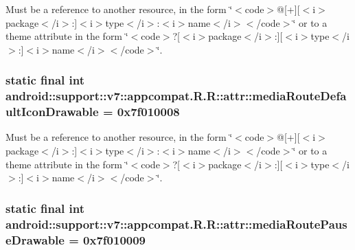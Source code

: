 Must be a reference to another resource, in the form \char`\"{}$<$code$>$@\mbox{[}+\mbox{]}\mbox{[}$<$i$>$package$<$/i$>$:\mbox{]}$<$i$>$type$<$/i$>$:$<$i$>$name$<$/i$>$$<$/code$>$\char`\"{} or to a theme attribute in the form \char`\"{}$<$code$>$?\mbox{[}$<$i$>$package$<$/i$>$:\mbox{]}\mbox{[}$<$i$>$type$<$/i$>$:\mbox{]}$<$i$>$name$<$/i$>$$<$/code$>$\char`\"{}. \hypertarget{classandroid_1_1support_1_1v7_1_1appcompat_1_1_r_1_1attr_a2b018175d87f4caa50b92655a0d5202}{
\subsubsection[{mediaRouteDefaultIconDrawable}]{\setlength{\rightskip}{0pt plus 5cm}static final int android::support::v7::appcompat.R.R::attr::mediaRouteDefaultIconDrawable = 0x7f010008}}
\label{classandroid_1_1support_1_1v7_1_1appcompat_1_1_r_1_1attr_a2b018175d87f4caa50b92655a0d5202}


Must be a reference to another resource, in the form \char`\"{}$<$code$>$@\mbox{[}+\mbox{]}\mbox{[}$<$i$>$package$<$/i$>$:\mbox{]}$<$i$>$type$<$/i$>$:$<$i$>$name$<$/i$>$$<$/code$>$\char`\"{} or to a theme attribute in the form \char`\"{}$<$code$>$?\mbox{[}$<$i$>$package$<$/i$>$:\mbox{]}\mbox{[}$<$i$>$type$<$/i$>$:\mbox{]}$<$i$>$name$<$/i$>$$<$/code$>$\char`\"{}. \hypertarget{classandroid_1_1support_1_1v7_1_1appcompat_1_1_r_1_1attr_590a7a8fdf38d9c1391d0c5e686c24ac}{
\subsubsection[{mediaRoutePauseDrawable}]{\setlength{\rightskip}{0pt plus 5cm}static final int android::support::v7::appcompat.R.R::attr::mediaRoutePauseDrawable = 0x7f010009}}
\label{classandroid_1_1support_1_1v7_1_1appcompat_1_1_r_1_1attr_590a7a8fdf38d9c1391d0c5e686c24ac}


